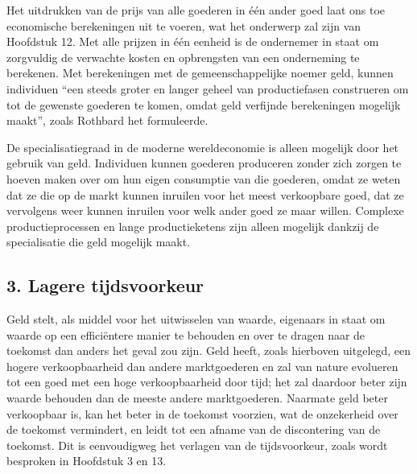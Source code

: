 Het uitdrukken van de prijs van alle goederen in één ander goed laat ons toe economische berekeningen uit te voeren, wat het onderwerp zal zijn van Hoofdstuk 12. Met alle prijzen in één eenheid is de ondernemer in staat om zorgvuldig de verwachte kosten en opbrengsten van een onderneming te berekenen. Met berekeningen met de gemeenschappelijke noemer geld, kunnen individuen ``een steeds groter en langer geheel van productiefasen construeren om tot de gewenste goederen te komen, omdat geld verfijnde berekeningen mogelijk maakt'', zoals Rothbard het formuleerde.\autocite{116}

De specialisatiegraad in de moderne wereldeconomie is alleen mogelijk door het gebruik van geld. Individuen kunnen goederen produceren zonder zich zorgen te hoeven maken over om hun eigen consumptie van die goederen, omdat ze weten dat ze die op de markt kunnen inruilen voor het meest verkoopbare goed, dat ze vervolgens weer kunnen inruilen voor welk ander goed ze maar willen. Complexe productieprocessen en lange productieketens zijn alleen mogelijk dankzij de specialisatie die geld mogelijk maakt.

\subsection{3. Lagere tijdsvoorkeur}

Geld stelt, als middel voor het uitwisselen van waarde, eigenaars in staat om waarde op een efficiëntere manier te behouden en over te dragen naar de toekomst dan anders het geval zou zijn. Geld heeft, zoals hierboven uitgelegd, een hogere verkoopbaarheid dan andere marktgoederen en zal van nature evolueren tot een goed met een hoge verkoopbaarheid door tijd; het zal daardoor beter zijn waarde behouden  dan de meeste andere marktgoederen. Naarmate geld beter verkoopbaar is, kan het beter in de toekomst voorzien, wat de onzekerheid over de toekomst vermindert, en leidt tot een afname van de discontering van de toekomst. Dit is eenvoudigweg het verlagen van de tijdsvoorkeur, zoals wordt besproken in Hoofdstuk 3 en 13.

